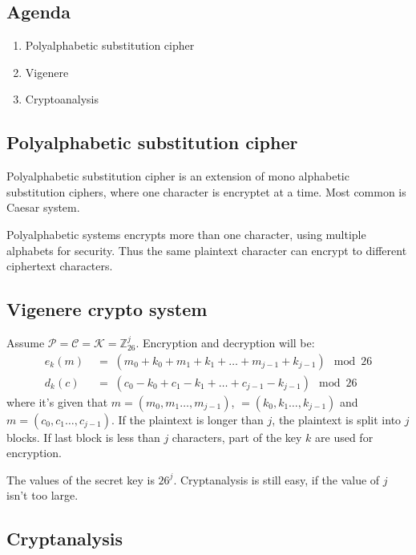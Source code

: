 

\subsection*{Agenda}
\begin{enumerate}
\item Polyalphabetic substitution cipher
\item Vigenere
\item Cryptoanalysis
\end{enumerate}

\subsection{Polyalphabetic substitution cipher}

Polyalphabetic substitution cipher is an extension of mono alphabetic
substitution ciphers, where one character is encryptet at a time. Most
common is Caesar system.

Polyalphabetic systems encrypts more than one character, using
multiple alphabets for security. Thus the same plaintext character can
encrypt to different ciphertext characters.

\subsection{Vigenere crypto system}

Assume $\mathcal{P} = \mathcal{C} = \mathcal{K} =
\mathbb{Z}_{26}^j$. Encryption and decryption will be:
\begin{align*}
  e_{k}(m) \; &= \; (m_0+k_0 +m_1+k_1 + \ldots
  +m_{j-1}+k_{j-1} )  \mod 26\\
  d_{k}(c) \; &= \; (c_0-k_0 +c_1-k_1 + \ldots +c_{j-1}-k_{j-1} ) \mod 26
\end{align*}
where it's given that $m=(m_0,m_1 \ldots,m_{j-1})$, $=(k_0,k_1
\ldots,k_{j-1})$ and $m=(c_0,c_1 \ldots,c_{j-1})$. If the plaintext is
longer than $j$, the plaintext is split into $j$ blocks. If last block
is less than $j$ characters, part of the key $k$ are used for
encryption.

The values of the secret key is $26^j$. Cryptanalysis is still easy,
if the value of $j$ isn't too large.
\subsection{Cryptanalysis}

